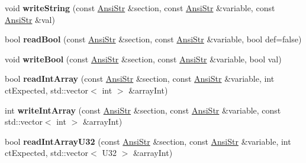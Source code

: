 \begin{DoxyCompactItemize}
\item 
\hypertarget{classps_1_1utils_1_1IniFile_ac69953da626a53d7a46d0ddcd879510d}{}void {\bfseries write\+String} (const \hyperlink{classps_1_1base_1_1CAString}{Ansi\+Str} \&section, const \hyperlink{classps_1_1base_1_1CAString}{Ansi\+Str} \&variable, const \hyperlink{classps_1_1base_1_1CAString}{Ansi\+Str} \&val)\label{classps_1_1utils_1_1IniFile_ac69953da626a53d7a46d0ddcd879510d}

\item 
\hypertarget{classps_1_1utils_1_1IniFile_a1ac87c714e4d5a89a0b116e2d19f33ed}{}bool {\bfseries read\+Bool} (const \hyperlink{classps_1_1base_1_1CAString}{Ansi\+Str} \&section, const \hyperlink{classps_1_1base_1_1CAString}{Ansi\+Str} \&variable, bool def=false)\label{classps_1_1utils_1_1IniFile_a1ac87c714e4d5a89a0b116e2d19f33ed}

\item 
\hypertarget{classps_1_1utils_1_1IniFile_ae574f5efb7fa245d428b043a331bf00e}{}void {\bfseries write\+Bool} (const \hyperlink{classps_1_1base_1_1CAString}{Ansi\+Str} \&section, const \hyperlink{classps_1_1base_1_1CAString}{Ansi\+Str} \&variable, bool val)\label{classps_1_1utils_1_1IniFile_ae574f5efb7fa245d428b043a331bf00e}

\item 
\hypertarget{classps_1_1utils_1_1IniFile_a88c23cbd0b42047cba44f538f8955549}{}bool {\bfseries read\+Int\+Array} (const \hyperlink{classps_1_1base_1_1CAString}{Ansi\+Str} \&section, const \hyperlink{classps_1_1base_1_1CAString}{Ansi\+Str} \&variable, int ct\+Expected, std\+::vector$<$ int $>$ \&array\+Int)\label{classps_1_1utils_1_1IniFile_a88c23cbd0b42047cba44f538f8955549}

\item 
\hypertarget{classps_1_1utils_1_1IniFile_afc7f4d702a9d1b1b8db7993f58792bcb}{}int {\bfseries write\+Int\+Array} (const \hyperlink{classps_1_1base_1_1CAString}{Ansi\+Str} \&section, const \hyperlink{classps_1_1base_1_1CAString}{Ansi\+Str} \&variable, const std\+::vector$<$ int $>$ \&array\+Int)\label{classps_1_1utils_1_1IniFile_afc7f4d702a9d1b1b8db7993f58792bcb}

\item 
\hypertarget{classps_1_1utils_1_1IniFile_a9ae3407a3ad2b42eaefef68a1900dba8}{}bool {\bfseries read\+Int\+Array\+U32} (const \hyperlink{classps_1_1base_1_1CAString}{Ansi\+Str} \&section, const \hyperlink{classps_1_1base_1_1CAString}{Ansi\+Str} \&variable, int ct\+Expected, std\+::vector$<$ U32 $>$ \&array\+Int)\label{classps_1_1utils_1_1IniFile_a9ae3407a3ad2b42eaefef68a1900dba8}


\end{DoxyCompactItemize}

